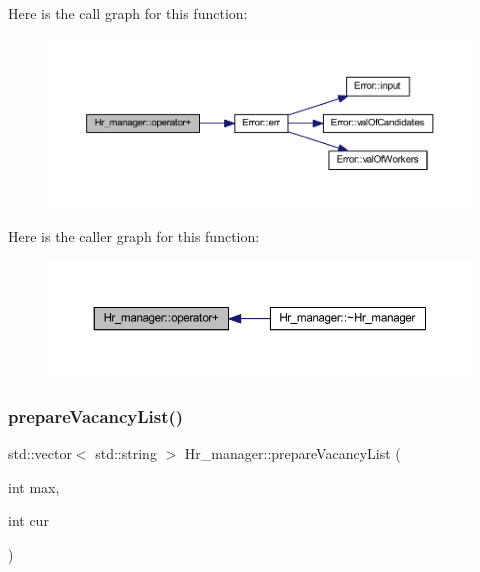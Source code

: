 Here is the call graph for this function\+:
\nopagebreak
\begin{figure}[H]
\begin{center}
\leavevmode
\includegraphics[width=350pt]{class_hr__manager_a3315b88815233ab95cd924280086d8a9_cgraph}
\end{center}
\end{figure}
Here is the caller graph for this function\+:
\nopagebreak
\begin{figure}[H]
\begin{center}
\leavevmode
\includegraphics[width=350pt]{class_hr__manager_a3315b88815233ab95cd924280086d8a9_icgraph}
\end{center}
\end{figure}
\hypertarget{class_hr__manager_a579ebdb8579aace02b9c2d2f29051c77}{}\label{class_hr__manager_a579ebdb8579aace02b9c2d2f29051c77} 
\subsubsection{\texorpdfstring{prepare\+Vacancy\+List()}{prepareVacancyList()}}
{\footnotesize\ttfamily std\+::vector$<$ std\+::string $>$ Hr\+\_\+manager\+::prepare\+Vacancy\+List (\begin{DoxyParamCaption}\item[{int}]{max,  }\item[{int}]{cur }\end{DoxyParamCaption})}

